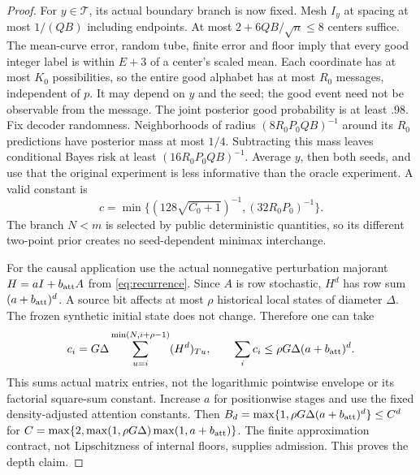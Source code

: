 \documentclass[11pt,letterpaper]{article}
\theoremstyle{definition}\newtheorem{definition}[theorem]{Definition}
\theoremstyle{remark}\newtheorem{remark}[theorem]{Remark}
\begin{document}
\begin{proof}
For $y\in\mathcal T$, its actual boundary branch is now fixed. Mesh $I_y$ at spacing at most $1/(QB)$ including endpoints. At most $2+6QB/\sqrt n\le8$ centers suffice. The mean-curve error, random tube, finite error and floor imply that every good integer label is within $E+3$ of a center's scaled mean. Each coordinate has at most $K_0$ possibilities, so the entire good alphabet has at most $R_0$ messages, independent of $p$. It may depend on $y$ and the seed; the good event need not be observable from the message. The joint posterior good probability is at least $.98$. Fix decoder randomness. Neighborhoods of radius $(8R_0P_0QB)^{-1}$ around its $R_0$ predictions have posterior mass at most $1/4$. Subtracting this mass leaves conditional Bayes risk at least $(16R_0P_0QB)^{-1}$. Average $y$, then both seeds, and use that the original experiment is less informative than the oracle experiment. A valid constant is
\[
 c=\min\{(128\sqrt{C_0+1})^{-1},(32R_0P_0)^{-1}\}.
\]
The branch $N<m$ is selected by public deterministic quantities, so its different two-point prior creates no seed-dependent minimax interchange.

For the causal application use the actual nonnegative perturbation majorant $H=aI+b_{\rm att}A$ from \eqref{eq:recurrence}. Since $A$ is row stochastic, $H^d$ has row sum $(a+b_{\rm att})^d$. A source bit affects at most $\rho$ historical local states of diameter $\Delta$. The frozen synthetic initial state does not change. Therefore one can take
\[
 c_i=G\Delta\sum_{u=i}^{\min(N,i+\rho-1)}(H^d)_{Tu},\qquad
 \sum_i c_i\le\rho G\Delta(a+b_{\rm att})^d.
\]
This sums actual matrix entries, not the logarithmic pointwise envelope or its factorial square-sum constant. Increase $a$ for positionwise stages and use the fixed density-adjusted attention constants. Then
$B_d=\max\{1,\rho G\Delta(a+b_{\rm att})^d\}\le C^d$ for
$C=\max\{2,\max(1,\rho G\Delta)\max(1,a+b_{\rm att})\}$.
The finite approximation contract, not Lipschitzness of internal floors, supplies admission. This proves the depth claim.
\end{proof}
\end{document}

